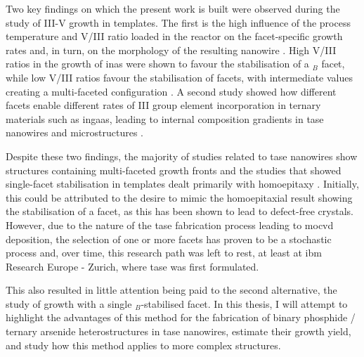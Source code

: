 Two key findings on which the present work is built were observed during the study of III-V growth in templates. The first is the high influence of the process temperature and V/III ratio loaded in the reactor on the facet-specific growth rates and, in turn, on the morphology of the resulting nanowire \cite{Goswami2020}. High V/III ratios in the growth of \acs{inas} were shown to favour the stabilisation of a \(_B\) facet, while low V/III ratios favour the stabilisation of  facets, with intermediate values creating a multi-faceted configuration \cite{Borg2015}. A second study showed how different facets enable different rates of III group element incorporation in ternary materials such as \acs{ingaas}, leading to internal composition gradients in \acs{tase} nanowires and microstructures \cite{Borg2019}.

Despite these two findings, the majority of studies related to \acs{tase} nanowires show structures containing multi-faceted growth fronts \cite{Knoedler2017, Han2016, Yan2021, Scherrer2024, Xue2021, Wen2022} and the studies that showed single-facet stabilisation in templates dealt primarily with homoepitaxy \cite{Brunelli2019}. Initially, this could be attributed to the desire to mimic the homoepitaxial result showing the stabilisation of a  facet, as this has been shown to lead to defect-free crystals. However, due to the nature of the \acs{tase} fabrication process leading to \acs{mocvd} deposition, the selection of one or more  facets has proven to be a stochastic process \cite{Knoedler2017} and, over time, this research path was left to rest, at least at \acs{ibm} Research Europe - Zurich, where \acs{tase} was first formulated.

This also resulted in little attention being paid to the second alternative, the study of growth with a single \(_B\)-stabilised facet. In this thesis, I will attempt to highlight the advantages of this method for the fabrication of binary phosphide / ternary arsenide heterostructures in \acs{tase} nanowires, estimate their growth yield, and study how this method applies to more complex structures.

